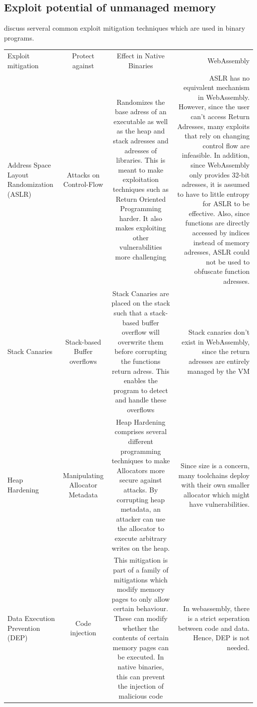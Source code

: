 \documentclass[sigconf]{acmart}
\begin{document}
\subsection{Exploit potential of unmanaged memory}
\cite{mcfadden_security_2018} discuss serveral common exploit mitigation techniques which are used in binary programs. 

\begin{tabular}[width=\textwidth]{ l | c | c | r }
  Exploit mitigation & Protect against & Effect in Native Binaries & WebAssembly \\
  Address Space Layout Randomization (ASLR) & Attacks on Control-Flow & Randomizes the base adress of an executable as well as the heap and stack adresses and adresses of libraries. This is meant to make exploitation techniques such as Return Oriented Programming harder. It also makes exploiting other vulnerabilities more challenging& ASLR has no equivalent mechanism in WebAssembly. However, since the user can't access Return Adresses, many exploits that rely on changing control flow are infeasible. In addition, since WebAssembly only provides 32-bit adresses, it is assumed to have to little entropy for ASLR to be effective. Also, since functions are directly accessed by indices instead of memory adresses, ASLR could not be used to obfuscate function adresses. \\
   Stack Canaries & Stack-based Buffer overflows & Stack Canaries are placed on the stack such that a stack-based buffer overflow will overwrite them before corrupting the functions return adress. This enables the program to detect and handle these overflows & Stack canaries don't exist in WebAssembly, since the return adresses are entirely managed by the VM \\
   Heap Hardening & Manipulating Allocator Metadata & Heap Hardening comprises several different programming techniques to make Allocators more secure against attacks. By corrupting heap metadata, an attacker can use the allocator to execute arbitrary writes on the heap. & Since size is a concern, many toolchains deploy with their own smaller allocator which might have vulnerabilities.\\
   Data Execution Prevention (DEP) & Code injection & This mitigation is part of a family of mitigations which modify memory pages to only allow certain behaviour. These can modify whether the contents of certain memory pages can be executed. In native binaries, this can prevent the injection of malicious code & In webassembly, there is a strict seperation between code and data. Hence, DEP is not needed. \\
\end{tabular}


\label{sec:binary_vulns}



\appendix
\end{document}
